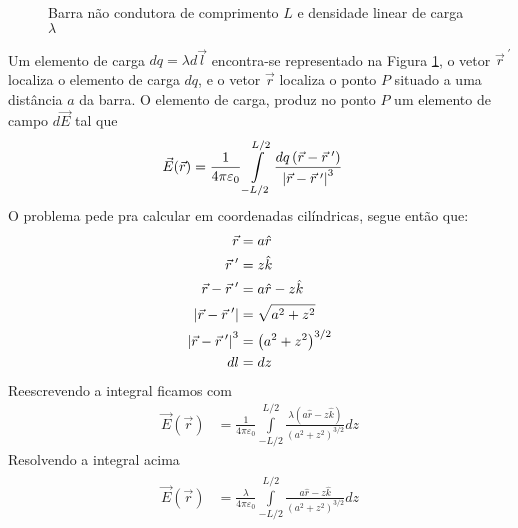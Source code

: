 \begin{prob}
\begin{sol}
\begin{figure}[htb!]

		\caption{Barra não condutora de comprimento $L$ e densidade linear de carga $\lambda$}
		\label{fig:fioDeCarga}
	\end{figure}

	Um elemento de carga $dq=\lambda d\vec{l}$ encontra-se representado na Figura \ref{fig:fioDeCarga}, o vetor $\vec{r}^{\;\prime}$ localiza o elemento de carga $dq$, e o vetor $\vec{r}$ localiza o ponto $P$ situado a uma distância $a$ da barra. O elemento de carga, produz no ponto $P$ um elemento de campo $d \vec{E}$ tal que
	\begin{align}
		\vec{E}(\vec{r}) &= \frac{1}{4 \pi \varepsilon_{0}} \int\limits_{-L/2}^{L/2}\frac{dq \left(\vec{r}-\vec{r}^{\;\prime}\right)}{\abs{\vec{r}-\vec{r}^{\;\prime}}^{3}}
	\end{align}
	O problema pede pra calcular em coordenadas cilíndricas, segue então que:
	\begin{subequations}
		\begin{align}
			\vec{r} &= a \hat{r}\\
			\vec{r}^{\;\prime} &= z \hat{k}\\
			\vec{r}-\vec{r}^{\;\prime} &= a \hat{r}-z \hat{k}\\
			\abs{\vec{r}-\vec{r}^{\;\prime}} &= \sqrt{a^{2}+z^{2}}\\
			\abs{\vec{r}-\vec{r}^{\;\prime}}^{3} &= \left(a^{2}+z^{2}\right)^{3/2}\\
			dl &= dz
		\end{align}
	\end{subequations}
	Reescrevendo a integral ficamos com
	\begin{align}
		\vec{E}(\vec{r}) &= \frac{1}{4 \pi \varepsilon_{0}}\int\limits_{-L/2}^{L/2}\frac{\lambda \left(a \hat{r}-z \hat{k}\right)}{\left(a^{2}+z^{2}\right)^{3/2}}dz
	\end{align}
	Resolvendo a integral acima
	\begin{align}
		\begin{split}
			\vec{E}(\vec{r}) &= \frac{\lambda}{4 \pi \varepsilon_{0}}\int\limits_{-L/2}^{L/2}\frac{a \hat{r}-z \hat{k}}{\left(a^{2}+z^{2}\right)^{3/2}}dz\\

\end{split}
\end{align}
\end{sol}
\end{prob}
